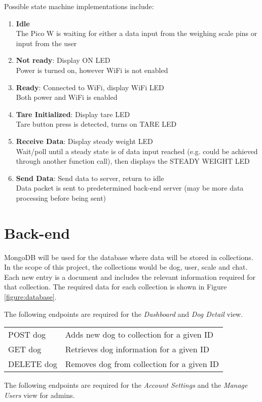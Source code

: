 Possible state machine implementations include:
\begin{enumerate}
\item \textbf{Idle}
\\The Pico W is waiting for either a data input from the weighing scale pins or input from the user
\item \textbf{Not ready}: Display ON LED
\\Power is turned on, however WiFi is not enabled
\item \textbf{Ready}: Connected to WiFi, display WiFi LED
\\Both power and WiFi is enabled
\item \textbf{Tare Initialized}: Display tare LED
\\Tare button press is detected, turns on TARE LED
\item \textbf{Receive Data}: Display steady weight LED
\\Wait/poll until a steady state is of data input reached (e.g. could be achieved through another function call), then displays the STEADY WEIGHT LED
\item \textbf{Send Data}: Send data to server, return to idle
\\Data packet is sent to predetermined back-end server (may be more data processing before being sent)
\end{enumerate}


\section{Back-end}
MongoDB will be used for the database where data will be stored in collections. In the scope of this project, the collections would be dog, user, scale and chat. Each new entry is a document and includes the relevant information required for that collection. The required data for each collection is shown in Figure \ref{figure:database}.

The following endpoints are required for the \textit{Dashboard} and \textit{Dog Detail} view.

\begin{tabular}{l|l}
POST dog & Adds new dog to collection for a given ID\\
GET dog & Retrieves dog information for a given ID\\
DELETE dog & Removes dog from collection for a given ID\\
\end{tabular}

The following endpoints are required for the \textit{Account Settings} and the \textit{Manage Users} view for admins.

